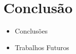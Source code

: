 \section{Conclusão}

\begin{frame}{}
	\begin{itemize}
		\item Conclusões
		\item Trabalhos Futuros
	\end{itemize}
\end{frame}